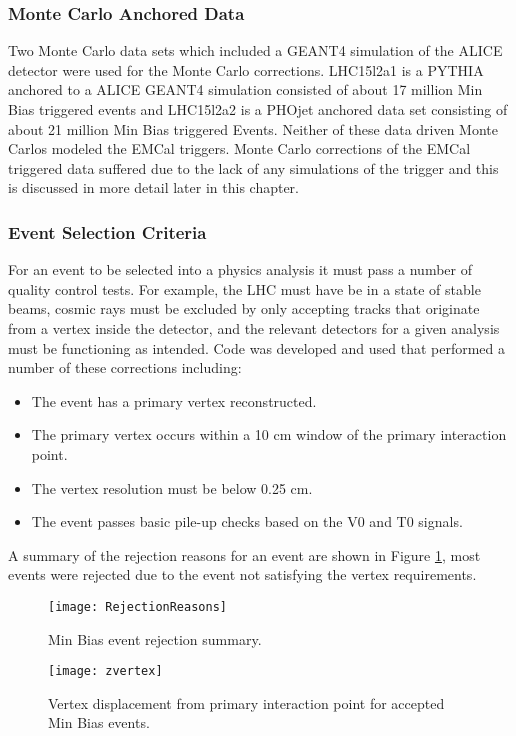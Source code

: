 \subsubsection{Monte Carlo Anchored Data}
Two Monte Carlo data sets which included a GEANT4 simulation of the ALICE detector were used for the Monte Carlo corrections.   LHC15l2a1 is a PYTHIA anchored to a ALICE GEANT4 simulation consisted of about 17 million Min Bias triggered events and LHC15l2a2 is a PHOjet anchored data set consisting of about 21 million Min Bias triggered Events.  Neither of these data driven Monte Carlos modeled the EMCal triggers.  Monte Carlo corrections of the EMCal triggered data suffered due to the lack of any simulations of the trigger and this is discussed in more detail later in this chapter.

\subsubsection{Event Selection Criteria}
For an event to be selected into a physics analysis it must pass a number of quality control tests.  For example, the LHC must have be in a state of stable beams, cosmic rays must be excluded by only accepting tracks that originate from a vertex inside the detector, and the relevant detectors for a given analysis must be functioning as intended.  Code was developed and used that performed a number of these corrections including:

\begin{itemize}
  \item The event has a primary vertex reconstructed.
  \item The primary vertex occurs within a 10 cm window of the primary interaction point.
  \item The vertex resolution must be below 0.25 cm.
  \item The event passes basic pile-up checks based on the V0 and T0 signals.
\end{itemize}

\noindent
A summary of the rejection reasons for an event are shown in Figure \ref{fig:eventqa}, most events were rejected due to the event not satisfying the vertex requirements.

\begin{figure}[h]
\texttt{[image: RejectionReasons]}
\centering
\caption{Min Bias event rejection summary.}
\label{fig:eventqa}
\end{figure}

\begin{figure}[h]
\texttt{[image: zvertex]}
\centering
\caption{Vertex displacement from primary interaction point for accepted Min Bias events.}
\label{fig:vertrec}
\end{figure}

